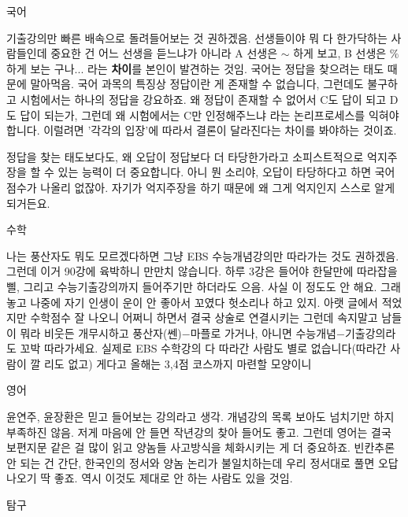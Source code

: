 국어
\vspace{5mm}

기출강의만 빠른 배속으로 돌려들어보는 것 권하겠음.
선생들이야 뭐 다 한가닥하는 사람들인데 중요한 건 어느 선생을 듣느냐가 아니라
A 선생은 $\sim$ 하게 보고, B 선생은 $\%$ 하게 보는 구나... 라는 \textbf{차이}를 본인이 발견하는 것임.
국어는 정답을 찾으려는 태도 때문에 말아먹음.
국어 과목의 특징상 정답이란 게 존재할 수 없습니다, 그런데도 불구하고 시험에서는 하나의 정답을 강요하죠.
왜 정답이 존재할 수 없어서 C도 답이 되고 D도 답이 되는가, 그런데 왜 시험에서는 C만 인정해주느냐
라는 논리프로세스를 익혀야 합니다. 이럴려면 '각각의 입장'에 따라서 결론이 달라진다는 차이를 봐야하는 것이죠.
\vspace{5mm}

정답을 찾는 태도보다도, 왜 오답이 정답보다 더 타당한가라고 소피스트적으로 억지주장을 할 수 있는 능력이 더 중요합니다.
아니 뭔 소리야, 오답이 타당하다고 하면 국어점수가 나올리 없잖아.
자기가 억지주장을 하기 때문에 왜 그게 억지인지 스스로 알게 되거든요.
\vspace{5mm}

수학
\vspace{5mm}

나는 풍산자도 뭐도 모르겠다하면 그냥 EBS 수능개념강의만 따라가는 것도 권하겠음.
그런데 이거 90강에 육박하니 만만치 않습니다. 하루 3강은 들어야 한달만에 따라잡을 삘,
그리고 수능기출강의까지 들어주기만 하더라도 으음.
사실 이 정도도 안 해요. 그래놓고 나중에 자기 인생이 운이 안 좋아서 꼬였다 헛소리나 하고 있지.
아랫 글에서 적었지만 수학점수 잘 나오니 어쩌니 하면서 결국 상술로 연결시키는 그런데 속지말고
남들이 뭐라 비웃든 개무시하고 풍산자(쎈)$-$마플로 가거나, 아니면 수능개념$-$기출강의라도 꼬박 따라가세요.
실제로 EBS 수학강의 다 따라간 사람도 별로 없습니다(따라간 사람이 깔 리도 없고)
게다고 올해는 3,4점 코스까지 마련할 모양이니
\vspace{5mm}

영어
\vspace{5mm}

윤연주, 윤장환은 믿고 들어보는 강의라고 생각.
개념강의 목록 보아도 넘치기만 하지 부족하진 않음. 저게 마음에 안 들면 작년강의 찾아 들어도 좋고.
그런데 영어는 결국 보편지문 같은 걸 많이 읽고 양놈들 사고방식을 체화시키는 게 더 중요하죠.
빈칸추론 안 되는 건 간단, 한국인의 정서와 양놈 논리가 불일치하는데 우리 정서대로 풀면 오답 나오기 딱 좋죠.
역시 이것도 제대로 안 하는 사람도 있을 것임.
\vspace{5mm}

탐구
\vspace{5mm}

